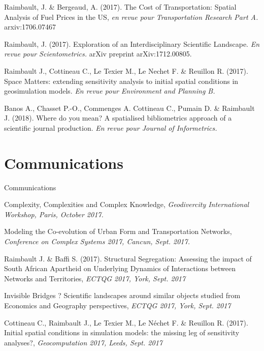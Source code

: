 \noindent Raimbault, J. \& Bergeaud, A. (2017). The Cost of Transportation: Spatial Analysis of Fuel Prices in the US, \textit{en revue pour Transportation Research Part A.} arxiv:1706.07467


\bigskip

\noindent Raimbault, J. (2017). Exploration of an Interdisciplinary Scientific Landscape. \textit{En revue pour Scientometrics.} arXiv preprint arXiv:1712.00805.

\bigskip

\noindent Raimbault J., Cottineau C., Le Texier M., Le Nechet F. \& Reuillon R.
 (2017). Space Matters: extending sensitivity analysis to initial spatial conditions in geosimulation models. \textit{En revue pour Environment and Planning B.}


\bigskip

\noindent Banos A., Chasset P.-O., Commenges A. Cottineau C., Pumain D. \& Raimbault J. (2018). Where do you mean? A spatialised bibliometrics approach of a scientific journal production. \textit{En revue pour Journal of Informetrics.}





\section*{Communications}{Communications}




\noindent Complexity, Complexities and Complex Knowledge, \textit{Geodivercity International Workshop, Paris, October 2017.}


\bigskip


\noindent Modeling the Co-evolution of Urban Form and Transportation Networks, \textit{Conference on Complex Systems 2017, Cancun, Sept. 2017.}

\bigskip

\noindent Raimbault J. \& Baffi S. (2017). Structural Segregation: Assessing the impact of South African Apartheid on Underlying Dynamics of Interactions between Networks and Territories, \textit{ECTQG 2017, York, Sept. 2017}


\bigskip


\noindent Invisible Bridges ? Scientific landscapes around similar objects studied from Economics and Geography perspectives, \textit{ECTQG 2017, York, Sept. 2017}


\bigskip


\noindent Cottineau C., Raimbault J., Le Texier M., Le N{\'e}chet F. \& Reuillon R. (2017). Initial spatial conditions in simulation models: the missing leg of sensitivity analyses?, \textit{Geocomputation 2017, Leeds, Sept. 2017}

